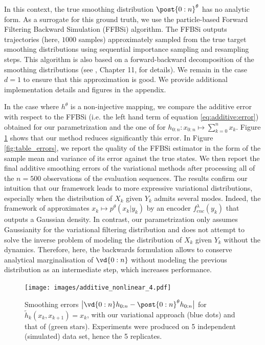 \documentclass{article}
\begin{document}
In this context, the true smoothing distribution $\post{0:n}^\parvec$ has no analytic form. As a surrogate for this ground truth, we use the particle-based Forward Filtering Backward Simulation (FFBSi) algorithm. The FFBSi outputs  trajectories (here, $1000$ samples) approximately sampled from the true target smoothing distributions using sequential importance sampling and resampling steps. This algorithm is also based on a forward-backward decomposition of the smoothing distributions (see \cite{douc2014nonlinear}, Chapter 11, for details). 
We remain in the case $d = 1$ to ensure that this approximation is good. We provide additional implementation details and figures in the appendix.

In the case where $h^\theta$ is a non-injective mapping, we compare the additive error with respect to the FFBSi (i.e. the left hand term of equation \eqref{eq:additive:error}) obtained for our parametrization and the one of \cite{Hlv2021DisentanglingIF} for $h_{0:n}: x_{0:n} \mapsto \sum_{k=0}^n x_k$. 
Figure \ref{fig:additive_error_nonlinear} shows that our method reduces significantly this error. In Figure \ref{fig:table_errors}, we report the quality of the FFBSi estimator in the form of the sample mean and variance of its error against the true states. We then report the final additive smoothing errors of the variational methods after processing all of the $n=500$ observations of the evaluation sequences. The results confirm our intuition that our framework leads to more expressive variational distributions, especially when the distribution of $X_k$ given $Y_k$ admits several modes. Indeed, the framework of \cite{Hlv2021DisentanglingIF} approximates $x_k \mapsto p^\theta(x_k|y_k)$ by an encoder   $f_{enc}^\lambda(y_k)$ that outputs a Gaussian density. 
In contrast, our parametrization only assumes Gaussianity for the variational filtering distribution and does not attempt to solve the inverse problem of modeling the distribution of $X_k$ given $Y_k$ without the dynamics. 
Therefore, here, the backwards formulation allows to conserve analytical marginalisation of $\vd{0:n}$ without modeling the previous distribution as an intermediate step, which increases performance.


\begin{figure}
      \texttt{[image: images/additive\_nonlinear\_4.pdf]}
      \caption{Smoothing errors $\big| \vd{0:n} h_{0:n} -  \post{0:n}^{\parvec} h_{0:n} \big|$ for $\tilde{h}_{k}(x_k, x_{k+1}) = x_k$, with our variational approach (blue dots) and that of \cite{Hlv2021DisentanglingIF} (green stars). Experiments were produced on 5 independent (simulated) data set, hence the 5 replicates.}
      \label{fig:additive_error_nonlinear}
\end{figure}
\end{document}
